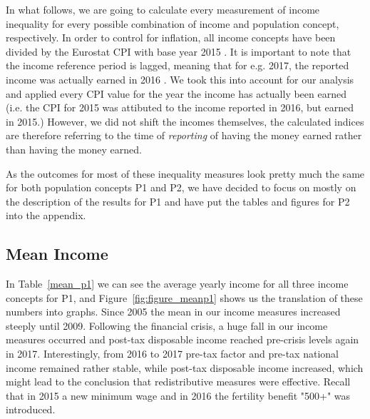 \documentclass[a4paper]{article}\usepackage[]{graphicx}\usepackage[]{color}
\begin{document}
In what follows, we are going to calculate every measurement of income inequality for every possible combination of income and population concept, respectively. In order to control for inflation, all income concepts have been divided by the Eurostat CPI with base year 2015 \parencite{eurostat_cpi}. It is important to note that the income reference period is lagged, meaning that for e.g. 2017, the reported income was actually earned in 2016 \parencite{eurostat2}. We took this into account for our analysis and applied every CPI value for the year the income has actually been earned (i.e. the CPI for 2015 was attibuted to the income reported in 2016, but earned in 2015.) However, we did not shift the incomes themselves, the calculated indices are therefore referring to the time of \textit{reporting} of having the money earned rather than having the money earned.

As the outcomes for most of these inequality measures look pretty much the same for both population concepts P1 and P2, we have decided to focus on mostly on the description of the results for P1 and have put the tables and figures for P2 into the appendix. 

\subsection{Mean Income}


In Table~\ref{mean_p1} we can see the average yearly income for all three income concepts for P1, and Figure~\ref{fig:figure_meanp1} shows us the translation of these numbers into graphs. Since 2005 the mean in our income measures increased steeply until 2009. 
Following the financial crisis, a huge fall in our income measures occurred and post-tax disposable income reached pre-crisis levels again in 2017.
Interestingly, from 2016 to 2017 pre-tax factor and pre-tax national income remained rather stable, while post-tax disposable income increased, which might lead to the conclusion that redistributive measures were effective. Recall that in 2015 a new minimum wage and in 2016 the fertility benefit "500+" was introduced.
\end{document}
